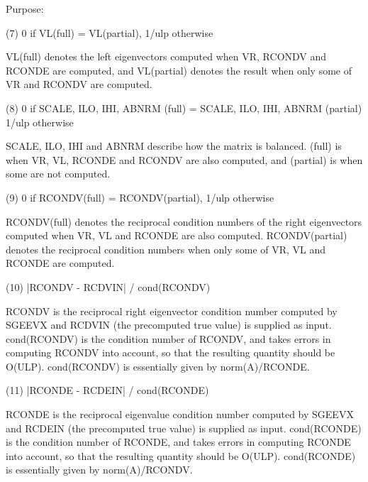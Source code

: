 \begin{DoxyParagraph}{Purpose\+: }
\begin{DoxyVerb}
    (7)     0 if VL(full) = VL(partial), 1/ulp otherwise

      VL(full) denotes the left eigenvectors computed when VR, RCONDV
      and RCONDE are computed, and VL(partial) denotes the result
      when only some of VR and RCONDV are computed.

    (8)     0 if SCALE, ILO, IHI, ABNRM (full) =
                 SCALE, ILO, IHI, ABNRM (partial)
            1/ulp otherwise

      SCALE, ILO, IHI and ABNRM describe how the matrix is balanced.
      (full) is when VR, VL, RCONDE and RCONDV are also computed, and
      (partial) is when some are not computed.

    (9)     0 if RCONDV(full) = RCONDV(partial), 1/ulp otherwise

      RCONDV(full) denotes the reciprocal condition numbers of the
      right eigenvectors computed when VR, VL and RCONDE are also
      computed. RCONDV(partial) denotes the reciprocal condition
      numbers when only some of VR, VL and RCONDE are computed.

   (10)     |RCONDV - RCDVIN| / cond(RCONDV)

      RCONDV is the reciprocal right eigenvector condition number
      computed by SGEEVX and RCDVIN (the precomputed true value)
      is supplied as input. cond(RCONDV) is the condition number of
      RCONDV, and takes errors in computing RCONDV into account, so
      that the resulting quantity should be O(ULP). cond(RCONDV) is
      essentially given by norm(A)/RCONDE.

   (11)     |RCONDE - RCDEIN| / cond(RCONDE)

      RCONDE is the reciprocal eigenvalue condition number
      computed by SGEEVX and RCDEIN (the precomputed true value)
      is supplied as input.  cond(RCONDE) is the condition number
      of RCONDE, and takes errors in computing RCONDE into account,
      so that the resulting quantity should be O(ULP). cond(RCONDE)
      is essentially given by norm(A)/RCONDV.\end{DoxyVerb}
 
\end{DoxyParagraph}

